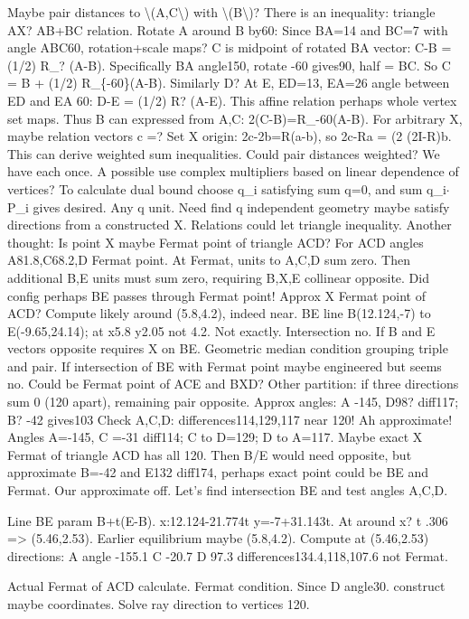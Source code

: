 \begin{decodedreasoningpanel}
Maybe pair distances to \textbackslash{}(A,C\textbackslash{}) with \textbackslash{}(B\textbackslash{})? There is an inequality:
  triangle AX? AB+BC relation. Rotate A around B by60: Since BA=14 and BC=7 with angle ABC60, rotation+scale maps? C is midpoint of rotated BA vector: C-B = (1/2) R\_? (A-B). Specifically BA angle150, rotate -60 gives90, half = BC. So C = B + (1/2) R\_\{-60\}(A-B). Similarly D? At E, ED=13, EA=26 angle between ED and EA 60: D-E = (1/2) R? (A-E). This affine relation perhaps whole vertex set maps. Thus B can expressed from A,C: 2(C-B)=R\_-60(A-B). For arbitrary X, maybe relation vectors c =? Set X origin: 2c-2b=R(a-b), so 2c-Ra = (2 (2I-R)b. This can derive weighted sum inequalities. Could pair distances weighted? We have each once. A possible use complex multipliers based on linear dependence of vertices? To calculate dual bound choose q\_i satisfying sum q=0, and sum q\_i\ensuremath{\cdot}P\_i gives desired. Any q unit. Need find q independent geometry maybe satisfy directions from a constructed X. Relations could let triangle inequality. Another thought: Is point X maybe Fermat point of triangle ACD? For ACD angles A81.8,C68.2,D Fermat point. At Fermat, units to A,C,D sum zero. Then additional B,E units must sum zero, requiring B,X,E collinear opposite. Did config perhaps BE passes through Fermat point! Approx X Fermat point of ACD? Compute likely around (5.8,4.2), indeed near. BE line B(12.124,-7) to E(-9.65,24.14); at x5.8 y2.05 not 4.2. Not exactly. Intersection no. If B and E vectors opposite requires X on BE. Geometric median condition grouping triple and pair. If intersection of BE with Fermat point maybe engineered but seems no. Could be Fermat point of ACE and BXD? Other partition: if three directions sum 0 (120 apart), remaining pair opposite. Approx angles: A -145, D98? diff117; B? -42 gives103 Check A,C,D: differences114,129,117 near 120! Ah approximate! Angles A=-145, C
  =-31 diff114; C to D=129; D to A=117. Maybe exact X Fermat of triangle ACD has all 120. Then B/E would need opposite, but approximate B=-42 and E132 diff174, perhaps exact point could be BE and Fermat. Our approximate off. Let's find intersection BE and test angles A,C,D.

Line BE param B+t(E-B). x:12.124-21.774t y=-7+31.143t.
At around x? t .306 =\textgreater{} (5.46,2.53). Earlier equilibrium maybe (5.8,4.2). Compute at (5.46,2.53) directions:
A angle -155.1
C -20.7
D 97.3
differences134.4,118,107.6 not Fermat.

Actual Fermat of ACD calculate. Fermat condition. Since D angle30. construct maybe coordinates. Solve ray direction to vertices 120.


\end{decodedreasoningpanel}
